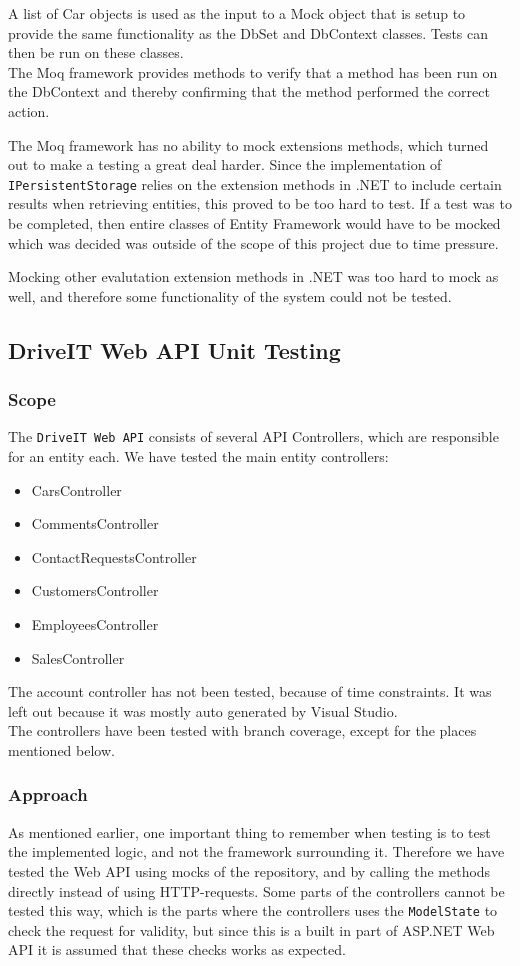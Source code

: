 A list of Car objects is used as the input to a Mock object that is setup to provide the same functionality as the DbSet and DbContext classes. Tests can then be run on these classes.\\
The Moq framework provides methods to verify that a method has been run on the DbContext and thereby confirming that the method performed the correct action. 

The Moq framework has no ability to mock extensions methods, which turned out to make a testing a great deal harder. Since the implementation of \texttt{IPersistentStorage} relies on the extension methods in .NET to include certain results when retrieving entities, this proved to be too hard to test. If a test was to be completed, then entire classes of Entity Framework would have to be mocked which was decided was outside of the scope of this project due to time pressure.

Mocking other evalutation extension methods in .NET was too hard to mock as well, and therefore some functionality of the system could not be tested.

\subsection{DriveIT Web API Unit Testing}
\subsubsection{Scope}
The \texttt{DriveIT Web API} consists of several API Controllers, which are responsible for an entity each. We have tested the main entity controllers:
\begin{itemize}
	\item CarsController
	\item CommentsController
	\item ContactRequestsController
	\item CustomersController
	\item EmployeesController
	\item SalesController
\end{itemize}
The account controller has not been tested, because of time constraints. It was left out because it was mostly auto generated by Visual Studio.\\

The controllers have been tested with branch coverage, except for the places mentioned below.
\subsubsection{Approach}
As mentioned earlier, one important thing to remember when testing is to test the implemented logic, and not the framework surrounding it. Therefore we have tested the Web API using mocks of the repository, and by calling the methods directly instead of using HTTP-requests.
Some parts of the controllers cannot be tested this way, which is the parts where the controllers uses the \texttt{ModelState} to check the request for validity, but since this is a built in part of ASP.NET Web API it is assumed that these checks works as expected.

